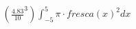 \documentclass[preview]{standalone}
\begin{document}
\begin{align*}
\left(\frac{4.83}{10}^{3}\right)\int_{-5}^{5}\pi\cdot fresca(x)^{2}dx
\end{align*}
\end{document}
